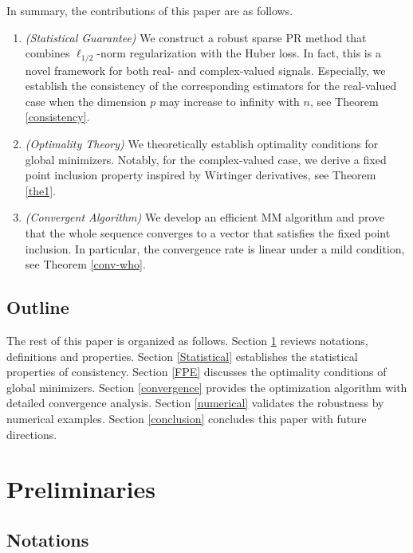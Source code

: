 \documentclass{article}
\numberwithin{equation}{section}
\begin{document}
In summary, the contributions of this paper are as follows.
\begin{enumerate}
  \item \textit{(Statistical Guarantee)} We construct a robust sparse PR method that combines $\ell_{1/2}$-norm regularization with the Huber loss. In fact, this is a novel framework for both real- and complex-valued signals. Especially, we establish the consistency of the corresponding estimators for the real-valued case when the dimension $p$ may increase to infinity with $n$, see Theorem \ref{consistency}.
  \item \textit{(Optimality Theory)} We theoretically establish optimality conditions for global minimizers. Notably, for the complex-valued case, we derive a fixed point inclusion property inspired by Wirtinger derivatives, see Theorem \ref{the1}.
  \item \textit{(Convergent Algorithm)} We develop an efficient MM algorithm and prove that the whole sequence converges to a vector that satisfies the fixed point inclusion. In particular, the convergence rate is linear under a mild condition, see Theorem \ref{conv-who}.
\end{enumerate}



\subsection{Outline}


The rest of this paper is organized as follows. Section \ref{Preliminaries} reviews notations, definitions and properties. Section \ref{Statistical} establishes the statistical properties of consistency. Section \ref{FPE} discusses the optimality conditions of global minimizers. Section \ref{convergence} provides the optimization algorithm with detailed convergence analysis. Section \ref{numerical} validates the robustness by numerical examples. Section \ref{conclusion} concludes this paper with future directions.

\section{Preliminaries}\label{Preliminaries}


\subsection{Notations} 
\end{document}
